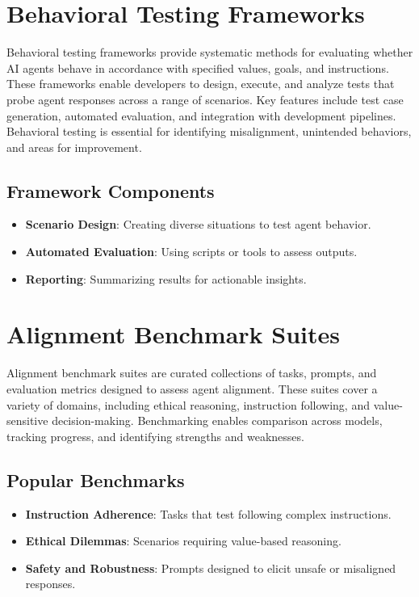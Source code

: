 
\begin{TNtwocol}

\section{Behavioral Testing Frameworks}
Behavioral testing frameworks provide systematic methods for evaluating whether AI agents behave in accordance with specified values, goals, and instructions. These frameworks enable developers to design, execute, and analyze tests that probe agent responses across a range of scenarios. Key features include test case generation, automated evaluation, and integration with development pipelines. Behavioral testing is essential for identifying misalignment, unintended behaviors, and areas for improvement.

\subsection{Framework Components}
\begin{itemize}
    \item \textbf{Scenario Design}: Creating diverse situations to test agent behavior.
    \item \textbf{Automated Evaluation}: Using scripts or tools to assess outputs.
    \item \textbf{Reporting}: Summarizing results for actionable insights.
\end{itemize}

\section{Alignment Benchmark Suites}
Alignment benchmark suites are curated collections of tasks, prompts, and evaluation metrics designed to assess agent alignment. These suites cover a variety of domains, including ethical reasoning, instruction following, and value-sensitive decision-making. Benchmarking enables comparison across models, tracking progress, and identifying strengths and weaknesses.

\subsection{Popular Benchmarks}
\begin{itemize}
    \item \textbf{Instruction Adherence}: Tasks that test following complex instructions.
    \item \textbf{Ethical Dilemmas}: Scenarios requiring value-based reasoning.
    \item \textbf{Safety and Robustness}: Prompts designed to elicit unsafe or misaligned responses.
\end{itemize}


\end{TNtwocol}
